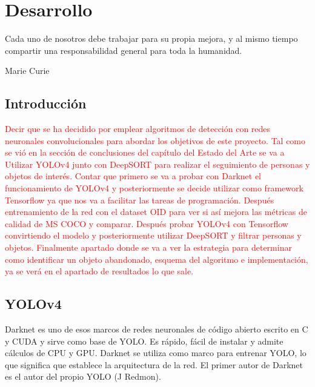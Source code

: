 
\chapter{Desarrollo}
\label{cha:desarrollo}

\begin{FraseCelebre}
  \begin{Frase}
    Cada uno de nosotros debe trabajar para su propia mejora, y al mismo tiempo compartir una responsabilidad general para toda la humanidad.
  \end{Frase}
  \begin{Fuente}
    Marie Curie
  \end{Fuente}
\end{FraseCelebre}

\section{Introducción}
\label{sec:intro-desarrollo}

\textcolor{red}{Decir que se ha decidido por emplear algoritmos de detección con redes neuronales convolucionales para abordar los objetivos de este proyecto. Tal como se vió en la sección de conclusiones del capítulo del Estado del Arte se va a Utilizar YOLOv4 junto con DeepSORT para realizar el seguimiento de personas y objetos de interés. Contar que primero se va a probar con Darknet el funcionamiento de YOLOv4 y posteriormente se decide utilizar como framework Tensorflow ya que nos va a facilitar las tareas de programación. Después entrenamiento de la red con el dataset OID para ver si así mejora las métricas de calidad de MS COCO y comparar. Después probar YOLOv4 con Tensorflow convirtiendo el modelo y posteriormente utilizar DeepSORT y filtrar personas y objetos. Finalmente apartado donde se va a ver la estrategia para determinar como identificar un objeto abandonado, esquema del algoritmo e implementación, ya se verá en el apartado de resultados lo que sale.}

\section{YOLOv4}
\label{sec:desarrollo-yolov4}

Darknet es uno de esos marcos de redes neuronales de código abierto escrito en C y CUDA y sirve como base de YOLO. Es rápido, fácil de instalar y admite cálculos de CPU y GPU. Darknet se utiliza como marco para entrenar YOLO, lo que significa que establece la arquitectura de la red. El primer autor de Darknet es el autor del propio YOLO (J Redmon).

